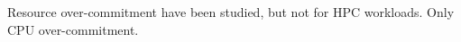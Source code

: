 Resource over-commitment have been studied, but not for HPC workloads. Only CPU over-commitment. \cite{tran2019,Tesfatsion2018}